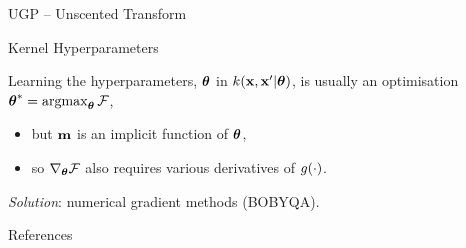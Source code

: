 \documentclass[final]{beamer}
\newlength{\onecolwid}
\begin{document}
\begin{frame}[t]
\begin{columns}[t]
\begin{column}{\onecolwid}
\begin{block}{UGP -- Unscented Transform}
\end{block}


\begin{block}{Kernel Hyperparameters}

Learning the hyperparameters, $\boldsymbol\theta$ in $k\!\left({\mathbf{x},
    \mathbf{x}'|\boldsymbol\theta}\right)$, is usually an optimisation $\boldsymbol\theta^* =
\operatorname*{\operatorname*{argmax}}_{\boldsymbol\theta}\mathcal{F}$,%
\begin{itemize}
    \item but $\mathbf{m}$ is an implicit function of $\boldsymbol\theta$,
    \item so $\nabla_{\boldsymbol\theta}\mathcal{F}$ also requires various derivatives of
        $g\!\left({{\cdot}}\right)$.
\end{itemize}
\emph{Solution}: numerical gradient methods (BOBYQA).

\end{block}






\begin{block}{References}

\small{
\vspace{0.75in}}

\end{block}






\end{column}
\end{columns}
\end{frame}
\end{document}
